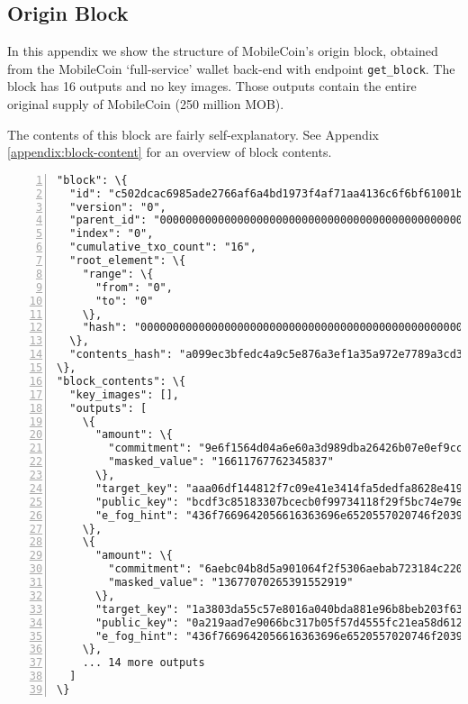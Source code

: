 \begin{appendices}
\chapter{Origin Block}
\label{appendix:origin-block}

In this appendix we show the structure of MobileCoin's origin block, obtained from the MobileCoin `full-service' wallet back-end \cite{mobilecoin-full-service-source-code} with endpoint {\tt get\_block}. The block has 16 outputs and no key images. Those outputs contain the entire original supply of MobileCoin (250 million MOB). %

The contents of this block are fairly self-explanatory. See Appendix \ref{appendix:block-content} for an overview of block contents.

\begin{Verbatim}[commandchars=\\\{\}, numbers=left]
"block": \{
  "id": "c502dcac6985ade2766af6a4bd1973f4af71aa4136c6f6bf61001b21e5ddf9ae",
  "version": "0",
  "parent_id": "0000000000000000000000000000000000000000000000000000000000000000",
  "index": "0",
  "cumulative_txo_count": "16",
  "root_element": \{
    "range": \{
      "from": "0",
      "to": "0"
    \},
    "hash": "0000000000000000000000000000000000000000000000000000000000000000"
  \},
  "contents_hash": "a099ec3bfedc4a9c5e876a3ef1a35a972e7789a3cd35a4b842094c517d631531"
\},
"block_contents": \{
  "key_images": [],
  "outputs": [
    \{
      "amount": \{
        "commitment": "9e6f1564d04a6e60a3d989dba26426b07e0ef9cc1e63915e538fd06ba56b0558",
        "masked_value": "16611767762345837"
      \},
      "target_key": "aaa06df144812f7c09e41e3414fa5dedfa8628e41981880c36d13c5e58cac11e",
      "public_key": "bcdf3c85183307bcecb0f99734118f29f5bc74e79eae44bd577606de9f129405",
      "e_fog_hint": "436f7669642056616363696e6520557020746f20393[...]3066633431373535"
    \},
    \{
      "amount": \{
        "commitment": "6aebc04b8d5a901064f2f5306aebab723184c22041e8b6552310825c8857ed14",
        "masked_value": "13677070265391552919"
      \},
      "target_key": "1a3803da55c57e8016a040bda881e96b8beb203f631df57562ac873b24eec301",
      "public_key": "0a219aad7e9066bc317b05f57d4555fc21ea58d61255c3e128b61cae5ed4545f",
      "e_fog_hint": "436f7669642056616363696e6520557020746f20393[...]3066633431373535"
    \},
    ... 14 more outputs
  ]
\}
\end{Verbatim}

\end{appendices}
